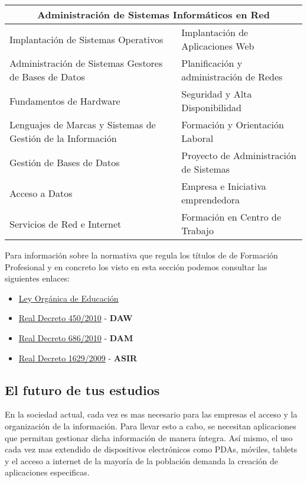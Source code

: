 \begin{center}
 \begin{table}[ht]
    {\renewcommand{\arraystretch}{1.5}
        \begin{tabular}[c]{ |l|l| }
            \hline
            \multicolumn{2}{|c|}{\textbf{Administración de Sistemas Informáticos en Red}} \\ \hline
            Implantación de Sistemas Operativos &  Implantación de Aplicaciones Web\\ \hline
            Administración de Sistemas Gestores de Bases de Datos & Planificación y administración de Redes \\ \hline
            Fundamentos de Hardware & Seguridad y Alta Disponibilidad \\ \hline
            Lenguajes de Marcas y Sistemas de Gestión de la Información & Formación y Orientación Laboral \\ \hline
            Gestión de Bases de Datos & Proyecto de Administración de Sistemas \\ \hline
            Acceso a Datos & Empresa e Iniciativa emprendedora \\ \hline
            Servicios de Red e Internet & Formación en Centro de Trabajo \\ \hline
    \end{tabular}}
 \end{table}
\end{center}

Para información sobre la normativa que regula los títulos de de Formación Profesional y en concreto los visto en esta sección podemos consultar las siguientes enlaces:

\begin{itemize}
    \item \href{https://www.boe.es/buscar/doc.php?id=BOE-A-2006-7899}{Ley Orgánica de Educación}
    \item \href{https://www.boe.es/boe/dias/2010/05/20/pdfs/BOE-A-2010-8067.pdf}{Real Decreto 450/2010} - \textbf{DAW}
    \item \href{https://www.boe.es/boe/dias/2010/06/12/pdfs/BOE-A-2010-9269.pdf}{Real Decreto 686/2010} - \textbf{DAM}
    \item \href{https://www.boe.es/boe/dias/2009/11/18/pdfs/BOE-A-2009-18355.pdf}{Real Decreto 1629/2009} - \textbf{ASIR}
\end{itemize}

\subsection{El futuro de tus estudios}
En la sociedad actual, cada vez es mas necesario para las empresas el acceso y la organización de la información. Para llevar esto a cabo, se necesitan aplicaciones que permitan gestionar dicha información de manera íntegra. Así mismo, el uso cada vez mas extendido de dispositivos electrónicos como PDAs, móviles, tablets y el acceso a internet de la mayoría de la población demanda la creación de aplicaciones especificas.


